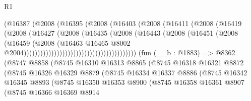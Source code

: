 \begin{lexlean}{R1}
\begin{coremodule}
                                            (@16387
                                              (@2008
                                                (@16395
                                                  (@2008
                                                    (@16403
                                                      (@2008
                                                        (@16411
                                                          (@2008
                                                            (@16419
                                                              (@2008
                                                                (@16427
                                                                  (@2008
                                                                    (@16435
                                                                      (@2008
                                                                        (@16443
                                                                          (@2008
                                                                            (@16451
                                                                              (@2008
                                                                                (@16459
                                                                                  (@2008
                                                                                    (@16463
                                                                                      @16465
                                                                                      @8002
                                                                                      @2004)))))))))))))))))))))))))))))))))))))))))
    (fun (__b : @1883) =>
    @8362
      (@8747
        @8858
        (@8745
          @16310
          @16313
          @8865
          (@8745
            @16318
            @16321
            @8872
            (@8745
              @16326
              @16329
              @8879
              (@8745
                @16334
                @16337
                @8886
                (@8745
                  @16342
                  @16345
                  @8893
                  (@8745
                    @16350
                    @16353
                    @8900
                    (@8745
                      @16358
                      @16361
                      @8907
                      (@8745
                        @16366
                        @16369
                        @8914

\end{coremodule}
\end{lexlean}
